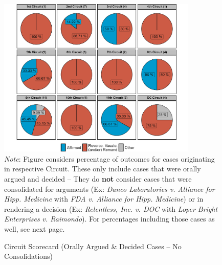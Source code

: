 \begin{landscape}
\begin{figure}[H]
\centering
\caption{Circuit Scorecard (Orally Argued \& Decided Cases -- No Consolidations)}
\vspace{2.5mm}
\includegraphics[width = 0.85\textwidth]{Figures/statpack_figures/circuit_scorecard_argued_decided_only.png} \\
\vspace{2.5mm}
\footnotesize{\emph{Note}: Figure considers percentage of outcomes for cases originating in respective Circuit. These only include cases that were orally argued and decided -- They do \textbf{not} consider cases that were consolidated for arguments (Ex: \emph{Danco Laboratories v. Alliance for Hipp. Medicine} with \emph{FDA v. Alliance for Hipp. Medicine}) or in rendering a decision (Ex: \emph{Relentless, Inc. v. DOC} with \emph{Loper Bright Enterprises v. Raimondo}). For percentages including those cases as well, see next page.} \\
\end{figure}
\end{landscape}

